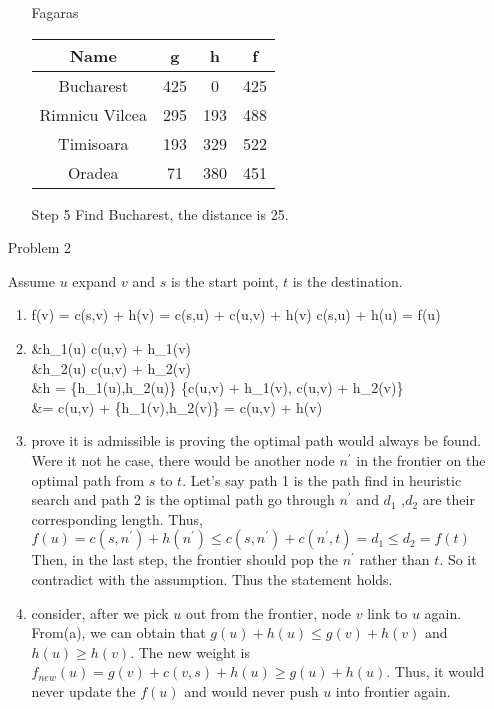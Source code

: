 \normalfont\documentclass[letterpaper,11pt]{article}
\begin{document}
\begin{enumerate}
\begin{enumerate}
			Fagaras\\
			\begin{tabular}{|c|c|c|c|}
				\hline
				Name & g & h & f\\
				\hline
				Bucharest & 425 & 0 & 425\\
				Rimnicu Vilcea &  295 & 193 & 488\\
				Timisoara & 193 &  329 & 522\\
				Oradea & 71 & 380 & 451\\
				\hline
			\end{tabular}
		\item [Step 5]
			Find Bucharest, the distance is 25.
	\end{enumerate}
\item[Problem 2]\par
	Assume $u$ expand $v$ and $s$ is the start point, $t$ is the destination.\\
	\begin{enumerate}	
		\item
		\begin{flalign*}
			f(v) = c(s,v) + h(v) = c(s,u) + c(u,v) + h(v) \ge c(s,u) + h(u) = f(u)
		\end{flalign*}
		\item
		\begin{flalign*}
		&h_1(u) \le c(u,v) + h_1(v)\\
		&h_2(u) \le c(u,v) + h_2(v)\\
		&h = \max\{h_1(u),h_2(u)\} \le \max\{c(u,v) + h_1(v), c(u,v) + h_2(v)\}\\
		&= c(u,v) + \max\{h_1(v),h_2(v)\} = c(u,v) + h(v)
		\end{flalign*}
		\item prove it is admissible is proving the optimal path would always be found. Were it not he case, there would be another node $n^\prime$ in the frontier on the optimal path from $s$ to $t$. Let's say path 1 is the path find in heuristic search and path 2 is the optimal path go through $n^\prime$ and $d_1$ ,$d_2$ are their corresponding length. Thus,\\$f(u) = c(s,n^\prime) + h(n^\prime) \le c(s,n^\prime) + c(n^\prime,t) = d_1 \le d_2 = f(t)$\\
		Then, in the last step, the frontier should pop the $n^\prime$ rather than $t$. So it contradict with the assumption. Thus the statement holds.
		\item consider, after we pick $u$ out from the frontier, node $v$ link to $u$ again. From(a), we can obtain that $g(u) + h(u) \le g(v) + h(v)$ and $h(u) \ge h(v)$. The new weight is $f_{new}(u) = g(v) + c(v,s) + h(u) \ge g(u) + h(u)$. Thus, it would never update the $f(u)$ and would never push $u$ into frontier again.

\end{enumerate}
\end{enumerate}
\end{document}
